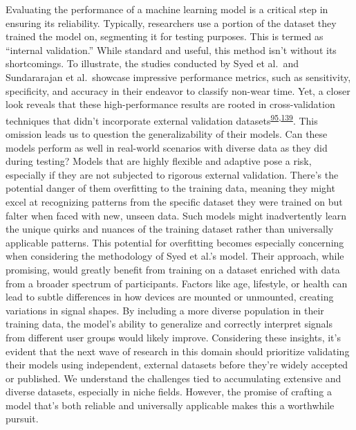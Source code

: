 \documentclass[
  10pt,
]{scrbook}
\begin{document}
Evaluating the performance of a machine learning model is a critical
step in ensuring its reliability. Typically, researchers use a portion
of the dataset they trained the model on, segmenting it for testing
purposes. This is termed as ``internal validation.'' While standard and
useful, this method isn't without its shortcomings. To illustrate, the
studies conducted by Syed et al.~and Sundararajan et al.~showcase
impressive performance metrics, such as sensitivity, specificity, and
accuracy in their endeavor to classify non-wear time. Yet, a closer look
reveals that these high-performance results are rooted in
cross-validation techniques that didn't incorporate external validation
datasets\textsuperscript{\protect\hyperlink{ref-sundararajan_sleep_2021}{95},\protect\hyperlink{ref-syed_evaluating_2020}{139}}.
This omission leads us to question the generalizability of their models.
Can these models perform as well in real-world scenarios with diverse
data as they did during testing? Models that are highly flexible and
adaptive pose a risk, especially if they are not subjected to rigorous
external validation. There's the potential danger of them overfitting to
the training data, meaning they might excel at recognizing patterns from
the specific dataset they were trained on but falter when faced with
new, unseen data. Such models might inadvertently learn the unique
quirks and nuances of the training dataset rather than universally
applicable patterns. This potential for overfitting becomes especially
concerning when considering the methodology of Syed et al.'s model.
Their approach, while promising, would greatly benefit from training on
a dataset enriched with data from a broader spectrum of participants.
Factors like age, lifestyle, or health can lead to subtle differences in
how devices are mounted or unmounted, creating variations in signal
shapes. By including a more diverse population in their training data,
the model's ability to generalize and correctly interpret signals from
different user groups would likely improve. Considering these insights,
it's evident that the next wave of research in this domain should
prioritize validating their models using independent, external datasets
before they're widely accepted or published. We understand the
challenges tied to accumulating extensive and diverse datasets,
especially in niche fields. However, the promise of crafting a model
that's both reliable and universally applicable makes this a worthwhile
pursuit.
\end{document}

